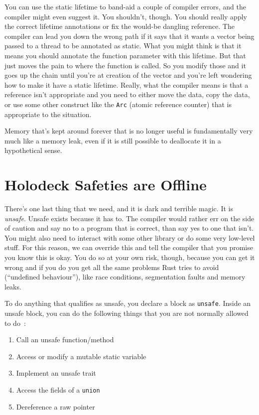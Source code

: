 You can use the static lifetime to band-aid a couple of compiler errors, and the compiler might even suggest it. You shouldn't, though. You should really apply the correct lifetime annotations or fix the would-be dangling reference. The compiler can lead you down the wrong path if it says that it wants a vector being passed to a thread to be annotated as static. What you might think is that it means you should annotate the function parameter with this lifetime. But that just moves the pain to where the function is called. So you modify those and it goes up the chain until you're at creation of the vector and you're left wondering how to make it have a static lifetime. Really, what the compiler means is that a reference isn't appropriate and you need to either move the data, copy the data, or use some other construct like the \texttt{Arc} (atomic reference counter) that is appropriate to the situation. 

Memory that's kept around forever that is no longer useful is fundamentally very much like a memory leak, even if it is still possible to deallocate it in a hypothetical sense.

\section*{Holodeck Safeties are Offline}
There's one last thing that we need, and it is dark and terrible magic. It is \textit{unsafe}. Unsafe exists because it has to. The compiler would rather err on the side of caution and say no to a program that is correct, than say yes to one that isn't. You might also need to interact with some other library or do some very low-level stuff. For this reason, we can override this and tell the compiler that you promise you know this is okay. You do so at your own risk, though, because you can get it wrong and if you do you get all the same problems Rust tries to avoid (``undefined behaviour''), like race conditions, segmentation faults and memory leaks.

To do anything that qualifies as unsafe, you declare a block as \texttt{unsafe}. 
Inside an unsafe block, you can do the following things that you are not normally allowed to do~\cite{rustdocs}:

\begin{enumerate}[noitemsep]
	\item Call an unsafe function/method
	\item Access or modify a mutable static variable
	\item Implement an unsafe trait
	\item Access the fields of a \texttt{union}
	\item Dereference a raw pointer
\end{enumerate}

